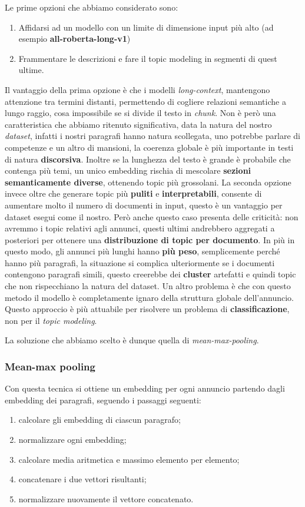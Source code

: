 \noindent Le prime opzioni che abbiamo considerato sono:
\begin{enumerate}
    \item Affidarsi ad un modello con un limite di dimensione input più alto (ad esempio \textbf{all-roberta-long-v1})
    \item Frammentare le descrizioni e fare il topic modeling in segmenti di quest ultime.
\end{enumerate}
Il vantaggio della prima opzione è che i modelli \textit{long-context}, mantengono attenzione tra termini distanti, permettendo di cogliere relazioni semantiche a lungo raggio, cosa impossibile se si divide il testo in \textit{chunk}.
Non è però una caratteristica che abbiamo ritenuto significativa, data la natura del nostro \textit{dataset}, infatti i nostri paragrafi hanno natura scollegata, uno potrebbe parlare di competenze e un altro di mansioni, la coerenza globale è più importante in testi di natura \textbf{discorsiva}.
Inoltre se la lunghezza del testo è grande è probabile che contenga più temi, un unico embedding rischia di mescolare \textbf{sezioni semanticamente diverse}, ottenendo topic più grossolani.
La seconda opzione invece oltre che generare topic più \textbf{puliti} e \textbf{interpretabili}, consente di aumentare molto il numero di documenti in input, questo è un vantaggio per dataset esegui come il nostro.
Però anche questo caso presenta delle criticità: non avremmo i topic relativi agli annunci, questi ultimi andrebbero aggregati a posteriori per ottenere una \textbf{distribuzione di topic per documento}. In più in questo modo, gli annunci più lunghi hanno \textbf{più peso}, semplicemente perché hanno più paragrafi, la situazione si complica ulteriormente se i documenti contengono paragrafi simili, questo creerebbe dei \textbf{cluster} artefatti e quindi topic che non rispecchiano la natura del dataset. Un altro problema è che con questo metodo il modello è completamente ignaro della struttura globale dell'annuncio.
Questo approccio è più attuabile per risolvere un problema di \textbf{classificazione}, non per il \textit{topic modeling}.\medskip

\noindent La soluzione che abbiamo scelto è dunque quella di \textit{mean-max-pooling}.
\subsubsection{Mean-max pooling}

\noindent Con questa tecnica si ottiene un embedding per ogni annuncio partendo dagli embedding dei paragrafi, seguendo i passaggi seguenti:
\begin{enumerate}
    \item calcolare gli embedding di ciascun paragrafo;
    \item normalizzare ogni embedding;
    \item calcolare media aritmetica e massimo elemento per elemento;
    \item concatenare i due vettori risultanti;
    \item normalizzare nuovamente il vettore concatenato.
\end{enumerate}

